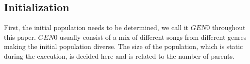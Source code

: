 \subsection{Initialization}
First, the initial population needs to be determined, we call it $GEN0$ throughout this paper. $GEN0$ usually consist of a mix of different songs from different genres making the initial population diverse. The size of the population, which is static during the execution, is decided here and is related to the number of parents. %
